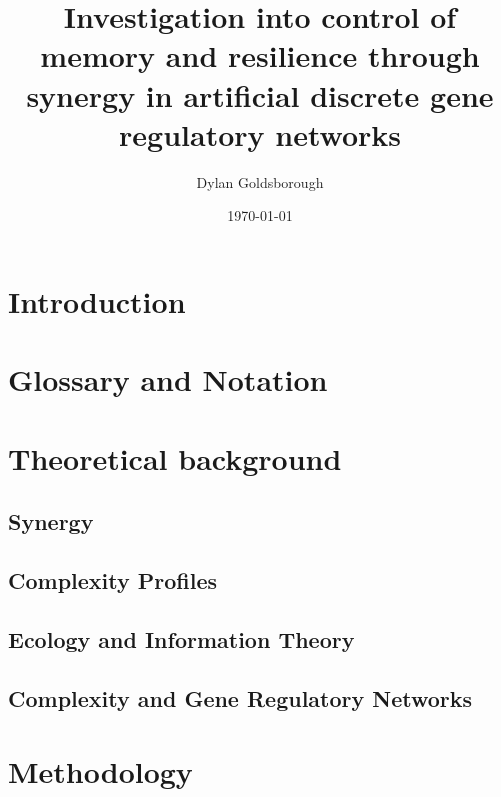 \documentclass{article}
\title{Investigation into control of memory and resilience through synergy in artificial discrete gene regulatory networks}
\author{Dylan Goldsborough}
\date{\today}
\begin{document}
\maketitle



\section{Introduction}
\label{sec:introduction}



\section{Glossary and Notation}



\section{Theoretical background}

\subsection{Synergy}
\label{sec:synergy}



\subsection{Complexity Profiles}
\label{sec:profile}



\subsection{Ecology and Information Theory}
\label{sec:ecology}


\subsection{Complexity and Gene Regulatory Networks}
\label{sec:grn}



\section{Methodology}
\label{sec:methods}
\end{document}
